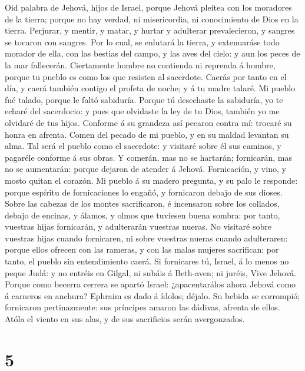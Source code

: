  Oid palabra de Jehová, hijos de Israel, porque Jehová
pleitea con los moradores de la tierra; porque no hay verdad, ni
misericordia, ni conocimiento de Dios en la tierra. 
Perjurar, y mentir, y matar, y hurtar y adulterar prevalecieron, y
sangres se tocaron con sangres.  Por lo cual, se enlutará la
tierra, y extenuaráse todo morador de ella, con las bestias del campo, y
las aves del cielo: y aun los peces de la mar fallecerán. 
Ciertamente hombre no contienda ni reprenda á hombre, porque tu pueblo
es como los que resisten al sacerdote.  Caerás por tanto en
el día, y caerá también contigo el profeta de noche; y á tu madre
talaré.  Mi pueblo fué talado, porque le faltó sabiduría.
Porque tú desechaste la sabiduría, yo te echaré del sacerdocio: y pues
que olvidaste la ley de tu Dios, también yo me olvidaré de tus hijos.
 Conforme á su grandeza así pecaron contra mí: trocaré su
honra en afrenta.  Comen del pecado de mi pueblo, y en su
maldad levantan su alma.  Tal será el pueblo como el
sacerdote: y visitaré sobre él sus caminos, y pagaréle conforme á sus
obras.  Y comerán, mas no se hartarán; fornicarán, mas no
se aumentarán: porque dejaron de atender á Jehová. 
Fornicación, y vino, y mosto quitan el corazón.  Mi pueblo
á su madero pregunta, y su palo le responde: porque espíritu de
fornicaciones lo engañó, y fornicaron debajo de sus dioses.
 Sobre las cabezas de los montes sacrificaron, é incensaron
sobre los collados, debajo de encinas, y álamos, y olmos que tuviesen
buena sombra: por tanto, vuestras hijas fornicarán, y adulterarán
vuestras nueras.  No visitaré sobre vuestras hijas cuando
fornicaren, ni sobre vuestras nueras cuando adulteraren: porque ellos
ofrecen con las rameras, y con las malas mujeres sacrifican: por tanto,
el pueblo sin entendimiento caerá.  Si fornicares tú,
Israel, á lo menos no peque Judá: y no entréis en Gilgal, ni subáis á
Beth-aven; ni juréis, Vive Jehová.  Porque como becerra
cerrera se apartó Israel: ¿apacentarálos ahora Jehová como á carneros en
anchura?  Ephraim es dado á ídolos; déjalo. 
Su bebida se corrompió; fornicaron pertinazmente: sus príncipes amaron
las dádivas, afrenta de ellos.  Atóla el viento en sus
alas, y de sus sacrificios serán avergonzados.

\hypertarget{section-4}{%
\section{5}\label{section-4}}

